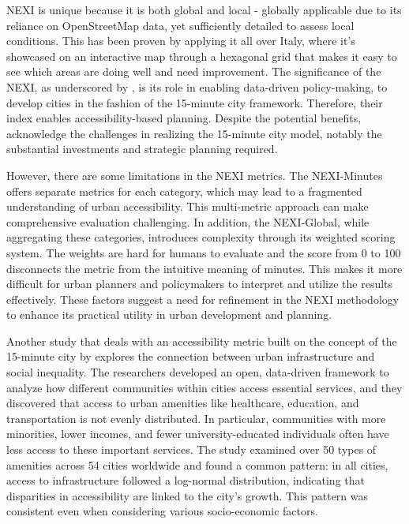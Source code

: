 NEXI is unique because it is both global and local - globally applicable due to its reliance on OpenStreetMap data, yet sufficiently detailed to assess local conditions.
This has been proven by applying it all over Italy, where it's showcased on an interactive map through a hexagonal grid that makes it easy to see which areas are doing well and need improvement.
The significance of the NEXI, as underscored by \cite{olivariAreItalianCities2023}, is its role in enabling data-driven policy-making, to develop cities in the fashion of the 15-minute city framework. 
Therefore, their index enables accessibility-based planning.
Despite the potential benefits, \cite{olivariAreItalianCities2023} acknowledge the challenges in realizing the 15-minute city model, notably the substantial investments and strategic planning required. 

However, there are some limitations in the NEXI metrics. 
The NEXI-Minutes offers separate metrics for each category, which may lead to a fragmented understanding of urban accessibility. 
This multi-metric approach can make comprehensive evaluation challenging. 
In addition, the NEXI-Global, while aggregating these categories, introduces complexity through its weighted scoring system. 
The weights are hard for humans to evaluate and the score from 0 to 100 disconnects the metric from the intuitive meaning of minutes.
This makes it more difficult for urban planners and policymakers to interpret and utilize the results effectively. 
These factors suggest a need for refinement in the NEXI methodology to enhance its practical utility in urban development and planning.


Another study that deals with an accessibility metric built on the concept of the 15-minute city by \cite{nicolettiDisadvantagedCommunitiesHave2023} explores the connection between urban infrastructure and social inequality. 
The researchers developed an open, data-driven framework to analyze how different communities within cities access essential services, and they discovered that access to urban amenities like healthcare, education, and transportation is not evenly distributed. 
In particular, communities with more minorities, lower incomes, and fewer university-educated individuals often have less access to these important services.
The study examined over 50 types of amenities across 54 cities worldwide and found a common pattern: in all cities, access to infrastructure followed a log-normal distribution, indicating that disparities in accessibility are linked to the city's growth. 
This pattern was consistent even when considering various socio-economic factors.


